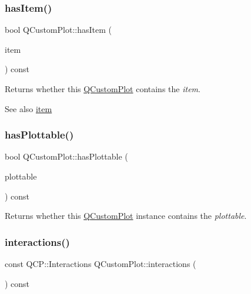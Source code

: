 \subsubsection{\texorpdfstring{hasItem()}{hasItem()}}
{\footnotesize\ttfamily bool Q\+Custom\+Plot\+::has\+Item (\begin{DoxyParamCaption}\item[{\mbox{\hyperlink{class_q_c_p_abstract_item}{Q\+C\+P\+Abstract\+Item}} $\ast$}]{item }\end{DoxyParamCaption}) const}

Returns whether this \mbox{\hyperlink{class_q_custom_plot}{Q\+Custom\+Plot}} contains the {\itshape item}.

\begin{DoxySeeAlso}{See also}
\mbox{\hyperlink{class_q_custom_plot_ac042f2e78edd228ccf2f26b7fe215239}{item}} 
\end{DoxySeeAlso}
\mbox{\label{class_q_custom_plot_a72cefbfbb9e699940e37be605bd9c51e}} 
\subsubsection{\texorpdfstring{hasPlottable()}{hasPlottable()}}
{\footnotesize\ttfamily bool Q\+Custom\+Plot\+::has\+Plottable (\begin{DoxyParamCaption}\item[{\mbox{\hyperlink{class_q_c_p_abstract_plottable}{Q\+C\+P\+Abstract\+Plottable}} $\ast$}]{plottable }\end{DoxyParamCaption}) const}

Returns whether this \mbox{\hyperlink{class_q_custom_plot}{Q\+Custom\+Plot}} instance contains the {\itshape plottable}. \mbox{\label{class_q_custom_plot_a2c78c5fd2943c148ab76652801d3f2dc}} 
\subsubsection{\texorpdfstring{interactions()}{interactions()}}
{\footnotesize\ttfamily const Q\+C\+P\+::\+Interactions Q\+Custom\+Plot\+::interactions (\begin{DoxyParamCaption}{ }\end{DoxyParamCaption}) const\hspace{0.3cm}{\ttfamily [inline]}}

